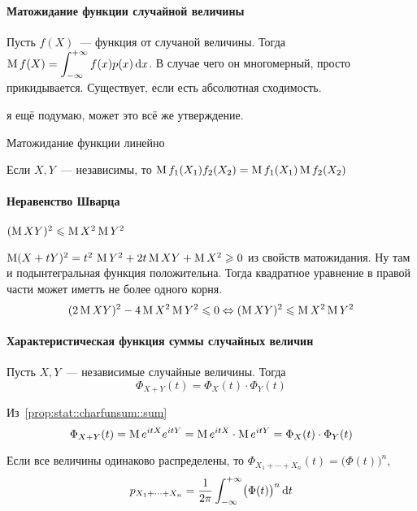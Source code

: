 \documentclass[12pt,ebook]{../../../notes}
\begin{document}
\paragraph{Матожидание функции случайной величины}
\label{par:stat::expfun}

\begin{defn}[$\ddot\sim$]\label{defn:stat::expfun::expfun}
  Пусть $f(X)$~--- функция от случаной величины. Тогда 
  $\displaystyle \operatorname{M} f(X) = \int_{-\infty}^{+\infty} f(x) p(x)\, \mathrm{d} x$. В случае чего он многомерный, просто
  прикидывается. Существует, если есть абсолютная сходимость.
\end{defn}
\begin{rem*}
  я ещё подумаю, может это всё же утверждение.
\end{rem*}
\begin{prop}\label{prop:stat::expfun::lin}
  Матожидание функции линейно
\end{prop}
\begin{prop}\label{prop:stat::expfun::mul}
  Если $X,Y$~--- независимы, то $\operatorname{M} f_1(X_1)f_2(X_2) = \operatorname{M} f_1(X_1) \operatorname{M} f_2(X_2)$
\end{prop}


\paragraph{Неравенство Шварца}
\label{par:stat::shwartz}

\begin{prop}\label{prop:stat::shwartz}
  $(\operatorname{M}  XY)^2 \leqslant \operatorname{M} X^2 \operatorname{M} Y^2$
\end{prop}
\begin{itlproof}
  $\operatorname{M} (X+ tY)^2 = t^2\,\operatorname{M} Y^2 + 2 t \operatorname{M} XY + \operatorname{M} X^2 \geqslant 0$ из свойств матожидания. Ну
  там и подынтегральная функция положительна. Тогда квадратное уравнение в правой части может
  иметть не более одного корня.
  \[
    (2 \operatorname{M} XY)^2 - 4 \operatorname{M} X^2 \operatorname{M} Y^2 \leqslant 0 \Leftrightarrow 
    (\operatorname{M}  XY)^2 \leqslant \operatorname{M} X^2 \operatorname{M} Y^2
  \]
\end{itlproof}

\paragraph{Характеристическая функция суммы случайных величин}
\label{par:stat::charfunsum}

\begin{prop}\label{prop:stat::charfunsum::sum}
  Пусть $X,Y$~--- независимые случайные величины. Тогда 
  \[
    \Phi_{X+Y}(t) = \Phi_X(t) \cdot \Phi_Y(t)
  \]
\end{prop}
\begin{itlproof}
  Из~\ref{prop:stat::charfunsum::sum}  
  \[
    \Phi_{X+Y}(t) = \operatorname{M} e^{itX} e^{itY} = \operatorname{M} e^{itX} \cdot \operatorname{M} e^{itY} = \Phi_{X}(t) \cdot
    \Phi_Y (t)
  \]
\end{itlproof}
\begin{cor}\label{conj:stat::charfunsum::sumn}
  Если все величины одинаково распределены, то $\Phi_{X_1 + \dotsb + X_n}(t) =
  \bigl(\Phi(t)\bigr)^n$, \[
    p_{X_1 + \dotsb + X_n} = \frac{1}{2\pi} \int_{-\infty}^{+\infty} \bigl(\Phi(t)\bigr)^n \, \mathrm{d} t 
  \]
\end{cor}
\end{document}
